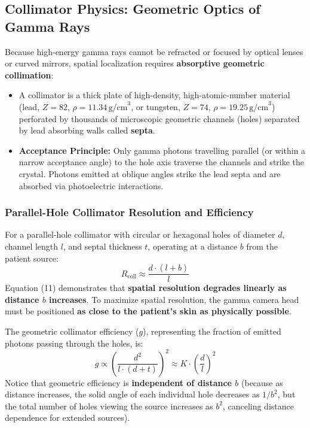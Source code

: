 \documentclass[11pt,a4paper]{article}
\begin{document}
\subsection{Collimator Physics: Geometric Optics of Gamma Rays}

Because high-energy gamma rays cannot be refracted or focused by optical lenses or curved mirrors, spatial localization requires \textbf{absorptive geometric collimation}:
\begin{itemize}[leftmargin=*]
    \item A collimator is a thick plate of high-density, high-atomic-number material (lead, $Z=82$, $\rho = 11.34\,\text{g/cm}^3$, or tungsten, $Z=74$, $\rho = 19.25\,\text{g/cm}^3$) perforated by thousands of microscopic geometric channels (holes) separated by lead absorbing walls called \textbf{septa}.
    \item \textbf{Acceptance Principle:} Only gamma photons travelling parallel (or within a narrow acceptance angle) to the hole axis traverse the channels and strike the crystal. Photons emitted at oblique angles strike the lead septa and are absorbed via photoelectric interactions.
\end{itemize}

\subsubsection{Parallel-Hole Collimator Resolution and Efficiency}
For a parallel-hole collimator with circular or hexagonal holes of diameter $d$, channel length $l$, and septal thickness $t$, operating at a distance $b$ from the patient source:
\begin{equation}
    R_{\text{coll}} \approx \frac{d \cdot (l + b)}{l}
\end{equation}
Equation (11) demonstrates that \textbf{spatial resolution degrades linearly as distance $b$ increases}. To maximize spatial resolution, the gamma camera head must be positioned \textbf{as close to the patient's skin as physically possible}.

The geometric collimator efficiency ($g$), representing the fraction of emitted photons passing through the holes, is:
\begin{equation}
    g \propto \left( \frac{d^2}{l \cdot (d + t)} \right)^2 \approx K \cdot \left( \frac{d}{l} \right)^2
\end{equation}
Notice that geometric efficiency is \textbf{independent of distance $b$} (because as distance increases, the solid angle of each individual hole decreases as $1/b^2$, but the total number of holes viewing the source increases as $b^2$, canceling distance dependence for extended sources).
\end{document}
